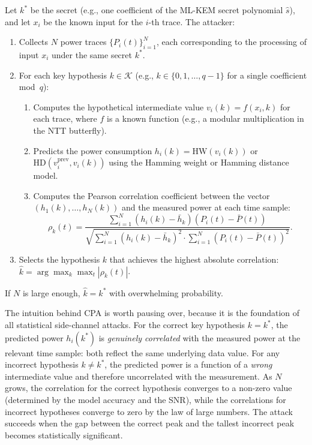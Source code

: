 \begin{definition}
\label{def:cpa}
Let $k^*$ be the secret (e.g., one coefficient of the ML-KEM secret polynomial $\hat{s}$), and let $x_i$ be the known input for the $i$-th trace.  The attacker:
\begin{enumerate}
\item Collects $N$ power traces $\{P_i(t)\}_{i=1}^N$, each corresponding to the processing of input $x_i$ under the same secret $k^*$.
\item For each key hypothesis $k \in \mathcal{K}$ (e.g., $k \in \{0, 1, \ldots, q-1\}$ for a single coefficient mod~$q$):
  \begin{enumerate}
  \item[(a)] Computes the hypothetical intermediate value $v_i(k) = f(x_i, k)$ for each trace, where $f$ is a known function (e.g., a modular multiplication in the NTT butterfly).
  \item[(b)] Predicts the power consumption $h_i(k) = \text{HW}(v_i(k))$ or $\text{HD}(v_i^{\text{prev}}, v_i(k))$ using the Hamming weight or Hamming distance model.
  \item[(c)] Computes the Pearson correlation coefficient between the vector $(h_1(k), \ldots, h_N(k))$ and the measured power at each time sample:
  \begin{equation}
  \label{eq:cpa-correlation}
  \rho_k(t) = \frac{\sum_{i=1}^N (h_i(k) - \bar{h}_k)(P_i(t) - \bar{P}(t))}{\sqrt{\sum_{i=1}^N (h_i(k) - \bar{h}_k)^2 \cdot \sum_{i=1}^N (P_i(t) - \bar{P}(t))^2}}.
  \end{equation}
  \end{enumerate}
\item Selects the hypothesis $k$ that achieves the highest absolute correlation: $\hat{k} = \arg\max_k \max_t |\rho_k(t)|$.
\end{enumerate}
If $N$ is large enough, $\hat{k} = k^*$ with overwhelming probability.
\end{definition}

The intuition behind CPA is worth pausing over, because it is the foundation of all statistical side-channel attacks.  For the correct key hypothesis $k = k^*$, the predicted power $h_i(k^*)$ is \emph{genuinely correlated} with the measured power at the relevant time sample: both reflect the same underlying data value.  For any incorrect hypothesis $k \neq k^*$, the predicted power is a function of a \emph{wrong} intermediate value and therefore uncorrelated with the measurement.  As $N$ grows, the correlation for the correct hypothesis converges to a non-zero value (determined by the model accuracy and the SNR), while the correlations for incorrect hypotheses converge to zero by the law of large numbers.  The attack succeeds when the gap between the correct peak and the tallest incorrect peak becomes statistically significant.


